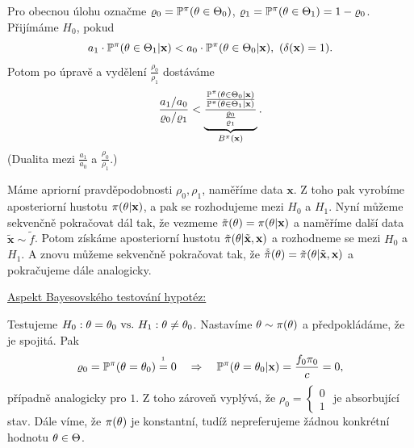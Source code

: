 Pro obecnou úlohu označme $\varrho_0=\mathbb{P}^\pi(\theta\in\Theta_0)$, $\varrho_1=\mathbb{P}^\pi(\theta\in\Theta_1)=1-\varrho_0$. Přijímáme $H_0$, pokud $$a_1\cdot \mathbb{P}^\pi(\theta\in\Theta_1|\textbf{x})<a_0\cdot\mathbb{P}^\pi(\theta\in\Theta_0|\textbf{x}),~(\delta(\textbf{x})=1).$$ 
Potom po úpravě a vydělení $\frac{\rho_0}{\rho_1}$ dostáváme
$$\frac{a_1/a_0}{\varrho_0/\varrho_1}<\underbrace{\frac{\frac{\mathbb{P}^\pi(\theta\in\Theta_0|\textbf{x})}{\mathbb{P}^\pi(\theta\in\Theta_1|\textbf{x})}}{\frac{\varrho_0}{\varrho_1}}}_{B^\pi(\textbf{x})}.$$
(Dualita mezi $\frac{a_1}{a_0}$ a $\frac{\rho_0}{\rho_1}$.)
\begin{remark}
	Máme apriorní pravděpodobnosti $\rho_0,\rho_1$, naměříme data $\textbf{x}$. Z toho pak vyrobíme aposteriorní hustotu $\pi(\theta|\textbf{x})$, a pak se rozhodujeme mezi $H_0$ a $H_1$. Nyní můžeme sekvenčně pokračovat dál tak, že vezmeme $\tilde{\pi}(\theta)=\pi(\theta|\textbf{x})$ a naměříme další data $\tilde{\textbf{x}}\sim \tilde{f}$. Potom získáme aposteriorní hustotu $\tilde{\pi}(\theta|\tilde{\textbf{x}},\textbf{x})$ a rozhodneme se mezi $H_0$ a $H_1$. A znovu můžeme sekvenčně pokračovat tak, že $\tilde{\tilde{\pi}}(\theta)=\tilde{\pi}(\theta|\tilde{\textbf{x}},\textbf{x})$ a pokračujeme dále analogicky.
\end{remark}


\underline{Aspekt Bayesovského testování hypotéz:}

Testujeme $H_0: \theta=\theta_0 ~\text{vs.}~ H_1: \theta\neq\theta_0$. Nastavíme $\theta\sim\pi(\theta)$ a předpokládáme, že je spojitá. Pak 
$$ \rho_0=\PP^\pi(\t=\t_0)\overset{\text{\footnotemark}}{=}0\quad\Rightarrow\quad \PP^\pi(\t=\t_0|\textbf{x})=\frac{f_0\pi_0}{c}=0,$$
případně analogicky pro $1$. Z toho zároveň vyplývá, že $\rho_0=\begin{cases}
0\\1
\end{cases}$ je absorbující stav. Dále víme, že $\pi(\theta)$ je konstantní, tudíž nepreferujeme žádnou konkrétní hodnotu $\theta\in\Theta$. 

